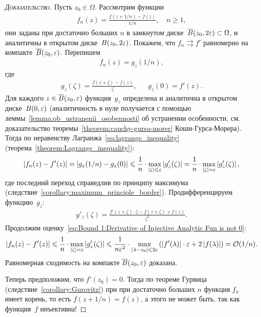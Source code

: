 \documentclass[../complex-analysis.tex]{subfiles}
\begin{document}
\begin{proof}[\normalfont\textsc{Доказательство}]
 Пусть $ z_0 \in \Omega $. Рассмотрим функции
 \begin{align*}
  f_n(z) = \frac{f\left(z + 1/n\right) - f(z)}{1 / n}, \quad n \geqslant 1,
 \end{align*} они заданы при достаточно больших $ n $ в замкнутом диске~$ \overline B(z_0, 2\varepsilon) \subset \Omega $, и аналитичны в открытом диске~$ B(z_0,2\varepsilon) $. Покажем, что $ f_n \rightrightarrows f' $ равномерно на компакте~$ \overline B(z_0,\varepsilon) $. Перепишем
 \begin{align*}
  f_n(z) = g_z(1 / n),
 \end{align*} где
 \begin{align*}
  g_z(\zeta) = \frac{f(z + \zeta) - f(z)}{\zeta}, &&g_z(0) = f'(z).
 \end{align*} Для каждого $ z \in \overline B(z_0,\varepsilon) $ функция~$ g_z $ определена и аналитична в открытом диске~$ B(0,\varepsilon) $ (аналитичность в нуле получается с помощью леммы~\ref{lemma:ob_ustranenii_osobennosti} об устранении особенности, см. доказательство теоремы~\ref{theorem:cauchy-gursa-morer} Коши-Гурса-Морера). Тогда по неравенству Лагранжа~\eqref{eq:lagrange_inequality} (теорема~\ref{theorem:Lagrange_inequality}):
 \begin{align}
  \label{eq:Bound 1:Derivative of Injective Analytic Fun is not 0}
  \left|f_n(z) - f'(z) \right| = \left|g_z(1 / n) - g_z(0) \right| \leqslant \frac{1}{n} \cdot \max_{\left| \zeta \right| \leqslant \varepsilon} \left| g'_z(\zeta) \right| = \frac{1}{n} \cdot \max_{\left| \zeta \right|=\varepsilon} \left| g_z'(\zeta) \right|,
 \end{align} где последний переход справедлив по принципу максимума (следствие~\ref{corollary:maximum_principle_border}). Продифференцируем функцию~$ g_z $:
  \begin{align*}
  g'_z(\zeta) = \frac{f'(z + \zeta) \cdot \zeta - f(z+\zeta)+f(z)}{\zeta^{2}}.
 \end{align*} Продолжим оценку~\eqref{eq:Bound 1:Derivative of Injective Analytic Fun is not 0}:
 \begin{align*}
  \left| f_n(z) - f'(z) \right| \leqslant \frac{1}{n} \cdot \max_{\left| \zeta \right|=\varepsilon} \left| g'_z(\zeta) \right| \leqslant \frac{1}{n\varepsilon^{2}} \cdot \max_{\left| \lambda - z_0 \right| \leqslant 2\varepsilon} \left( \left| f'(\lambda) \right| \cdot \varepsilon + 2 \left| f(\lambda) \right| \right) = \mathcal{O}(1 / n).
 \end{align*} Равномерная сходимость на компакте $ \overline B(z_0,\varepsilon) $ доказана. 
 
 Теперь предположим, что $ f'(z_0) = 0 $. Тогда по теореме Гурвица (следствие~\ref{corollary:Gurovitz}) при при достаточно больших $ n $ функция $ f_n $ имеет корень, то есть $ f(z + 1 / n)  = f(z)$, а этого не может быть, так как функция~$ f $ инъективна!
\end{proof}
\end{document}
